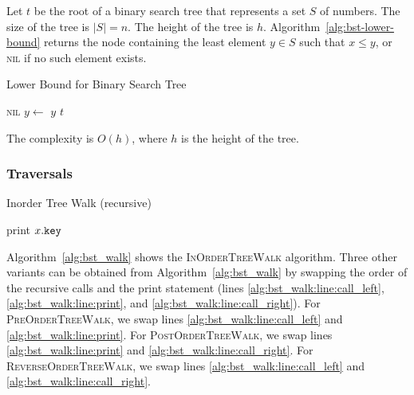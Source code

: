 \begin{example}
  Let $t$ be the root of a binary search tree that represents a set $S$ of numbers. 
  The size of the tree is $|S|=n$. 
  The height of the tree is $h$. Algorithm~\ref{alg:bst-lower-bound} returns the node containing the least element $y \in S$ such that $x \leq y$, or \textsc{nil} if no such element exists.
  
  \begin{algorithm}[htb]
    \caption{Lower Bound for Binary Search Tree}
    \label{alg:bst-lower-bound}
    \begin{algorithmic}[1]
       
      \State \Return \textsc{nil}
      \EndIf
      \State \Return {}
      \Else
      \State $y \gets $ 
      \State \Return $y$
      \Else
      \State \Return $t$
      \EndIf
      \EndIf
      \EndFunction
    \end{algorithmic}
  \end{algorithm}
  The complexity is $O(h)$, where $h$ is the height of the tree. 
  \end{example}
  

\subsubsection{Traversals}
\begin{algorithm}[htb]
  \caption{Inorder Tree Walk (recursive)}
  \label{alg:bst_walk}
  \begin{algorithmic}[1]
        \State {} \label{alg:bst_walk:line:call_left}
        \State print \(x\mathtt{.}\mathtt{key}\) \label{alg:bst_walk:line:print}
        \State {} \label{alg:bst_walk:line:call_right}
      \EndIf
    \EndFunction
  \end{algorithmic}
\end{algorithm}

Algorithm~\ref{alg:bst_walk} shows the \textsc{InOrderTreeWalk} algorithm.
Three other variants can be obtained from Algorithm~\ref{alg:bst_walk} by swapping the order of the recursive calls and the print statement (lines \ref{alg:bst_walk:line:call_left}, \ref{alg:bst_walk:line:print}, and \ref{alg:bst_walk:line:call_right}).
For \textsc{PreOrderTreeWalk}, we swap lines \ref{alg:bst_walk:line:call_left} and \ref{alg:bst_walk:line:print}.
For \textsc{PostOrderTreeWalk}, we swap lines \ref{alg:bst_walk:line:print} and \ref{alg:bst_walk:line:call_right}.
For \textsc{ReverseOrderTreeWalk}, we swap lines \ref{alg:bst_walk:line:call_left} and \ref{alg:bst_walk:line:call_right}.

